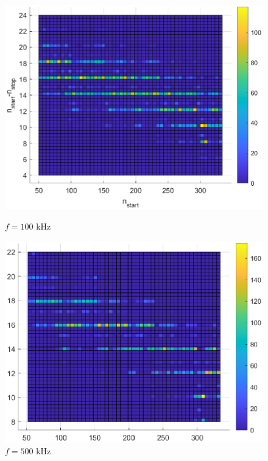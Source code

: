 \begin{figure}[H]
     \centering
     \begin{minipage}{0.45\textwidth}
         \centering
         \includegraphics[width=\textwidth]{imagenes/start-stop_100k.eps} %
         \caption{$f = 100$ kHz}
     \end{minipage}\hfill
     \begin{minipage}{0.45\textwidth}
         \centering
         \includegraphics[width=\textwidth]{imagenes/start-stop_500k.eps} %
         \caption{$f = 500$ kHz}
     \end{minipage}
     

\end{figure}
